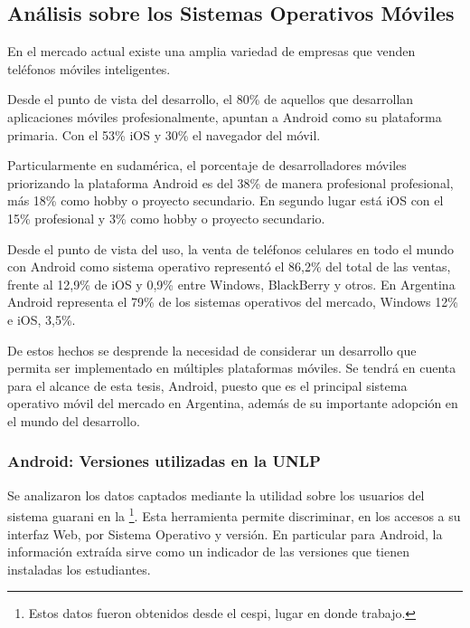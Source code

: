 \subsection{Análisis sobre los Sistemas Operativos Móviles}
\label{sistemas_operativos}

En el mercado actual existe una amplia variedad de empresas que venden
teléfonos móviles inteligentes.

Desde el punto de vista del desarrollo, el 80\% de aquellos que desarrollan
aplicaciones móviles profesionalmente, apuntan a Android como su plataforma
primaria. Con el 53\% iOS y 30\% el navegador del móvil\cite{DevNation2}.


Particularmente en sudamérica, el porcentaje de desarrolladores móviles
priorizando la plataforma Android es del 38\% de manera profesional profesional,
más 18\% como hobby o proyecto secundario. En segundo lugar está iOS con el 15\%
profesional y 3\% como hobby o proyecto secundario\cite{DevNation2}.

Desde el punto de vista del uso, la venta de teléfonos celulares en todo el
mundo con Android como sistema operativo representó el 86,2\% del total de las
ventas, frente al 12,9\% de iOS y 0,9\% entre Windows, BlackBerry y otros.
En Argentina Android representa el 79\% de los sistemas operativos del mercado,
Windows 12\% e iOS, 3,5\%\cite{SmartphoneMarketShare}.

De estos hechos se desprende la necesidad de considerar un desarrollo que permita ser implementado en múltiples plataformas móviles. Se tendrá en cuenta para el alcance de esta tesis, Android, puesto que es el principal sistema operativo móvil del mercado en Argentina\cite{SmartphoneMarketShare}, además de su importante adopción en el mundo del desarrollo\cite{DevNation2}.

\subsubsection{Android: Versiones utilizadas en la UNLP}
\label{sistemas_operativos_versiones}

 Se analizaron los datos captados mediante la utilidad  sobre los usuarios del sistema \gls{guarani} en la \unlp{}\footnote{Estos datos fueron obtenidos desde el \gls{cespi}, lugar en donde trabajo.}. Esta herramienta permite discriminar, en los accesos a su interfaz Web, por Sistema Operativo y versión. En particular para Android, la información extraída sirve como un indicador de las versiones que tienen instaladas los estudiantes.

